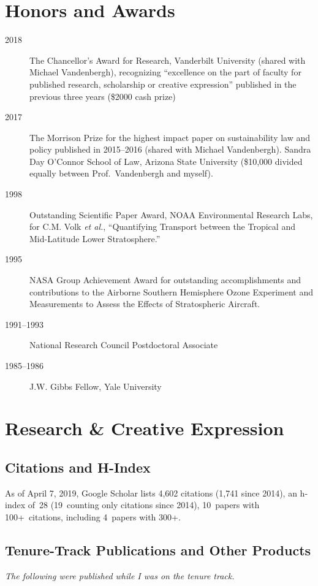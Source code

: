 \documentclass[10pt]{article}
\begin{document}
\section{Honors and Awards}
\begin{description}
\item[2018] The Chancellor's Award for Research, Vanderbilt University (shared with Michael Vandenbergh), recognizing ``excellence on the part of faculty for published research, scholarship or creative expression'' published in the previous three years (\$2000 cash prize)
\item[2017] The Morrison Prize for the highest impact paper on sustainability law and policy published in 2015--2016 (shared with Michael Vandenbergh). Sandra Day O'Connor School of Law, Arizona State University (\$10,000 divided equally between Prof.\ Vandenbergh and myself).
\item[1998] Outstanding Scientific Paper Award, NOAA Environmental Research Labs, for C.M. Volk \emph{et al.}, ``Quantifying Transport between the Tropical and Mid-Latitude Lower Stratosphere.''
\item[1995] NASA Group Achievement Award for outstanding accomplishments and contributions to the Airborne Southern Hemisphere Ozone Experiment and Measurements to Assess the Effects of Stratospheric Aircraft.
\item[1991--1993] National Research Council Postdoctoral Associate
\item[1985--1986] J.W. Gibbs Fellow, Yale University
\end{description}

\section{Research \& Creative Expression}
	\subsection{Citations and H-Index}
		As of April 7, 2019, Google Scholar lists
        4,602 citations (1,741 since 2014),
        an h-index of~28 (19~counting only citations since 2014),
        10~papers with 100+~citations, including 4~papers with 300+.
    \subsection[Tenure-Track]{Tenure-Track Publications and Other Products}
    \emph{The following were published while I was on the tenure track.}
\end{document}
